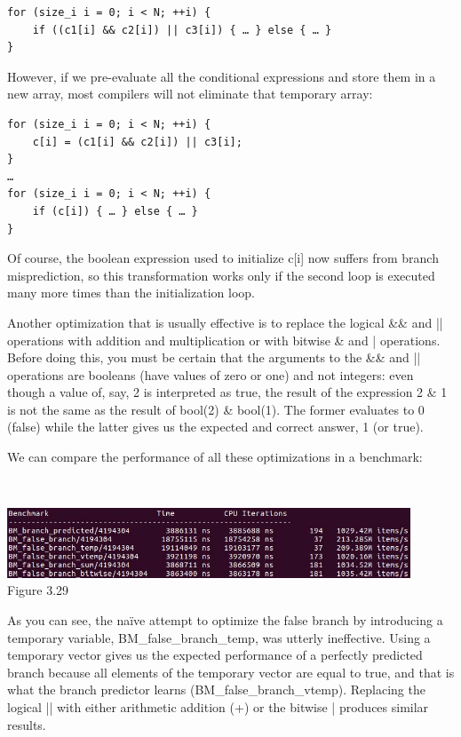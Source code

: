 \begin{lstlisting}[style=styleCXX]
for (size_i i = 0; i < N; ++i) {
	if ((c1[i] && c2[i]) || c3[i]) { … } else { … }
}
\end{lstlisting}

However, if we pre-evaluate all the conditional expressions and store them in a new array, most compilers will not eliminate that temporary array:

\begin{lstlisting}[style=styleCXX]
for (size_i i = 0; i < N; ++i) {
	c[i] = (c1[i] && c2[i]) || c3[i];
}
…
for (size_i i = 0; i < N; ++i) {
	if (c[i]) { … } else { … }
}
\end{lstlisting}

Of course, the boolean expression used to initialize c[i] now suffers from branch misprediction, so this transformation works only if the second loop is executed many more times than the initialization loop.

Another optimization that is usually effective is to replace the logical \&\& and || operations with addition and multiplication or with bitwise \& and | operations. Before doing this, you must be certain that the arguments to the \&\& and || operations are booleans (have values of zero or one) and not integers: even though a value of, say, 2 is interpreted as true, the result of the expression 2 \& 1 is not the same as the result of bool(2) \& bool(1). The former evaluates to 0 (false) while the latter gives us the expected and correct answer, 1 (or true).

We can compare the performance of all these optimizations in a benchmark:

\hspace*{\fill} \\ %
\begin{center}
\includegraphics[width=0.9\textwidth]{content/1/chapter3/images/29.jpg}\\
Figure 3.29
\end{center}

As you can see, the naïve attempt to optimize the false branch by introducing a temporary variable, BM\_false\_branch\_temp, was utterly ineffective. Using a temporary vector gives us the expected performance of a perfectly predicted branch because all elements of the temporary vector are equal to true, and that is what the branch predictor learns (BM\_false\_branch\_vtemp). Replacing the logical || with either arithmetic addition (+) or the bitwise | produces similar results.

